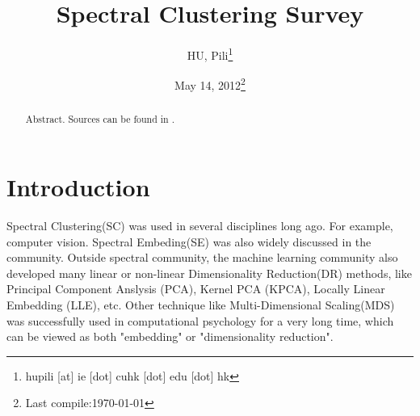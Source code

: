

\usepackage{algorithm}
\usepackage{algorithmic}
\renewcommand{\algorithmicrequire}{\textbf{Input:}}
\renewcommand{\algorithmicensure}{\textbf{Output:}}

\newcommand{\nL}{\mathcal{L}}
\newcommand{\nA}{\mathcal{A}}
\newcommand{\sym}[1]{#1_{\text{sym}}}
\newcommand{\rw}[1]{#1_{\text{rw}}}
\newcommand{\cut}[1]{\text{cut}(#1)}
\newcommand{\assoc}[1]{\text{assoc}(#1)}
\newcommand{\vol}[1]{\text{vol}(#1)}
\newcommand{\mpinv}{+}


\usepackage{subfigure}


\author{HU, Pili\thanks{hupili [at] ie [dot] cuhk [dot] edu [dot] hk}}

\title{Spectral Clustering Survey}
\date{May 14, 2012\thanks{Last compile:\today}}



\maketitle
\begin{abstract}
	Abstract. Sources can be found in \cite{hu2012-spectral2hop}. 
\end{abstract}

\pagebreak
\setcounter{tocdepth}{3}
\tableofcontents
\pagebreak



\section{Introduction}
\label{sec:introduction}

Spectral Clustering(SC) was used in several disciplines long ago. 
For example, computer vision\cite{shi2000normalized}.
Spectral Embeding(SE) was 
also widely discussed in the community\cite{brand2003unifying}. 
Outside spectral community, the machine learning community also 
developed many linear or non-linear Dimensionality Reduction(DR) methods, 
like Principal Component Anslysis (PCA), Kernel PCA (KPCA)\cite{scholkopf1998kpca}, 
Locally Linear Embedding (LLE)\cite{roweis2000lle}, etc. 
Other technique like Multi-Dimensional Scaling(MDS) was successfully 
used in computational psychology for a very long time\cite{borg2005modern}, 
which can be viewed as both "embedding" or "dimensionality reduction".

